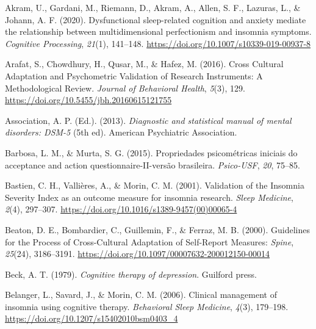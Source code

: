 \documentclass[
  ,doc,11pt, twoside,floatsintext]{apa6}
\newlength{\cslhangindent}
\newlength{\cslentryspacingunit} %
\newenvironment{CSLReferences}[2] %
 {%
  \setlength{\parindent}{0pt}
  \ifodd #1
  \let\oldpar\par
  \def\par{\hangindent=\cslhangindent\oldpar}
  \fi
  \setlength{\parskip}{#2\cslentryspacingunit}
 }%
 {}
\begin{document}
\hypertarget{refs}{}
\begin{CSLReferences}{1}{0}
\leavevmode{}%
Akram, U., Gardani, M., Riemann, D., Akram, A., Allen, S. F., Lazuras, L., \& Johann, A. F. (2020). Dysfunctional sleep-related cognition and anxiety mediate the relationship between multidimensional perfectionism and insomnia symptoms. \emph{Cognitive Processing}, \emph{21}(1), 141--148. \url{https://doi.org/10.1007/s10339-019-00937-8}

\leavevmode{}%
Arafat, S., Chowdhury, H., Qusar, M., \& Hafez, M. (2016). Cross {Cultural Adaptation} and {Psychometric Validation} of {Research Instruments}: A {Methodological Review}. \emph{Journal of Behavioral Health}, \emph{5}(3), 129. \url{https://doi.org/10.5455/jbh.20160615121755}

\leavevmode{}%
Association, A. P. (Ed.). (2013). \emph{Diagnostic and statistical manual of mental disorders: {DSM}-5} (5th ed). {American Psychiatric Association}.

\leavevmode{}%
Barbosa, L. M., \& Murta, S. G. (2015). Propriedades psicométricas iniciais do acceptance and action questionnaire-II-versão brasileira. \emph{Psico-USF}, \emph{20}, 75--85.

\leavevmode{}%
Bastien, C. H., Vallières, A., \& Morin, C. M. (2001). Validation of the {Insomnia Severity Index} as an outcome measure for insomnia research. \emph{Sleep Medicine}, \emph{2}(4), 297--307. \url{https://doi.org/10.1016/s1389-9457(00)00065-4}

\leavevmode{}%
Beaton, D. E., Bombardier, C., Guillemin, F., \& Ferraz, M. B. (2000). Guidelines for the {Process} of {Cross-Cultural Adaptation} of {Self-Report Measures}: \emph{Spine}, \emph{25}(24), 3186--3191. \url{https://doi.org/10.1097/00007632-200012150-00014}

\leavevmode{}%
Beck, A. T. (1979). \emph{Cognitive therapy of depression}. Guilford press.

\leavevmode{}%
Belanger, L., Savard, J., \& Morin, C. M. (2006). Clinical management of insomnia using cognitive therapy. \emph{Behavioral Sleep Medicine}, \emph{4}(3), 179--198. \url{https://doi.org/10.1207/s15402010bsm0403_4}


\end{CSLReferences}
\end{document}
